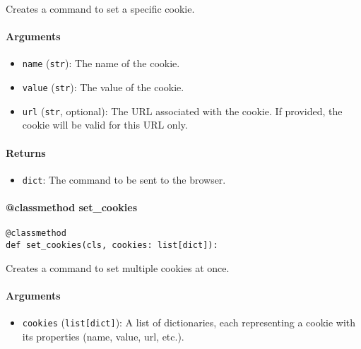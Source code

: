 \documentclass{article}
\begin{document}
\noindent Creates a command to set a specific cookie.

\paragraph{Arguments}

\begin{itemize}
    \item \lstinline[style=pythonstyle]|name| (\lstinline[style=pythonstyle]|str|): The name of the cookie.
    \item \lstinline[style=pythonstyle]|value| (\lstinline[style=pythonstyle]|str|): The value of the cookie.
    \item \lstinline[style=pythonstyle]|url| (\lstinline[style=pythonstyle]|str|, optional): The URL associated with the cookie. If provided, the cookie will be valid for this URL only.
\end{itemize}

\paragraph{Returns}

\begin{itemize}
    \item \lstinline[style=pythonstyle]|dict|: The command to be sent to the browser.
\end{itemize}

\paragraph{@classmethod set\_cookies}

\begin{lstlisting}[style=pythonstyle]
@classmethod
def set_cookies(cls, cookies: list[dict]):
\end{lstlisting}

\noindent Creates a command to set multiple cookies at once.

\paragraph{Arguments}

\begin{itemize}
    \item \lstinline[style=pythonstyle]|cookies| (\lstinline[style=pythonstyle]|list[dict]|): A list of dictionaries, each representing a cookie with its properties (name, value, url, etc.).
\end{itemize}
\end{document}
